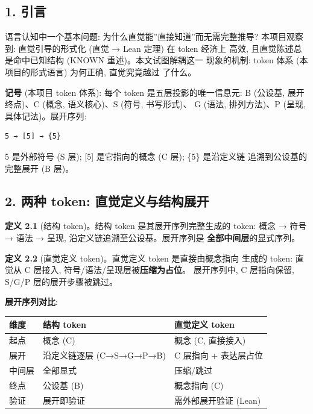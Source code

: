\documentclass[
]{article}
\begin{document}
\subsection{1. 引言}\label{ux5f15ux8a00}

语言认知中一个基本问题: 为什么直觉能''直接知道''而无需完整推导?
本项目观察到: 直觉引导的形式化 (直觉 → Lean 定理) 在 token 经济上 高效,
且直觉陈述总是命中已知结构 (KNOWN 重述)。本文试图解耦这一 现象的机制:
token 体系 (本项目的形式语言) 为何正确, 直觉究竟越过 了什么。

\textbf{记号} (本项目 token 体系): 每个 token 是五层投影的唯一信息元: B
(公设基, 展开终点)、C (概念, 语义核心)、S (符号, 书写形式)、 G (语法,
排列方法)、P (呈现, 具体记法)。展开序列:

\begin{verbatim}
5 → [5] → {5}
\end{verbatim}

5 是外部符号 (S 层); {[}5{]} 是它指向的概念 (C 层); \{5\} 是沿定义链
追溯到公设基的完整展开 (B 层)。

\subsection{2. 两种 token:
直觉定义与结构展开}\label{ux4e24ux79cd-token-ux76f4ux89c9ux5b9aux4e49ux4e0eux7ed3ux6784ux5c55ux5f00}

\textbf{定义 2.1} (结构 token)。结构 token 是其展开序列完整生成的 token:
概念 → 符号 → 语法 → 呈现, 沿定义链追溯至公设基。展开序列是
\textbf{全部中间层}的显式序列。

\textbf{定义 2.2} (直觉定义 token)。直觉定义 token 是直接由概念指向
生成的 token: 直觉从 C 层接入, 符号/语法/呈现层被\textbf{压缩为占位}。
展开序列中, C 层指向保留, S/G/P 层的展开步骤被跳过。

\textbf{展开序列对比}:

\begin{longtable}[]{@{}lll@{}}
\toprule\noalign{}
维度 & 结构 token & 直觉定义 token \\
\midrule\noalign{}
\endhead
\bottomrule\noalign{}
\endlastfoot
起点 & 概念 (C) & 概念 (C, 直接接入) \\
展开 & 沿定义链逐层 (C→S→G→P→B) & C 层指向 + 表达层占位 \\
中间层 & 全部显式 & 压缩/跳过 \\
终点 & 公设基 (B) & 概念指向 (C) \\
验证 & 展开即验证 & 需外部展开验证 (Lean) \\
\end{longtable}
\end{document}
